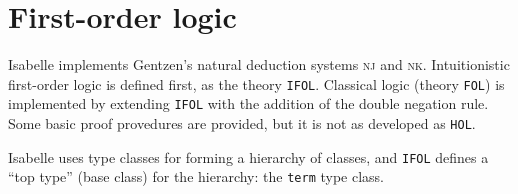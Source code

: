 \section{First-order logic}

\begin{node}\label{isabelle:fol-0000}%
Isabelle implements Gentzen's natural deduction systems \textsc{nj} and
\textsc{nk}. Intuitionistic first-order logic is defined first, as the
theory \texttt{IFOL}. Classical logic (theory \texttt{FOL}) is
implemented by extending \texttt{IFOL} with the addition of the double
negation rule. Some basic proof provedures are provided, but it is not
as developed as \texttt{HOL}.
\end{node}

\begin{node}[Terms]\label{isabelle:fol-0003}%
Isabelle uses type classes for forming a hierarchy of classes, and
\texttt{IFOL} defines a ``top type'' (base class) for the
hierarchy: the \texttt{term} type class.
\end{node}

